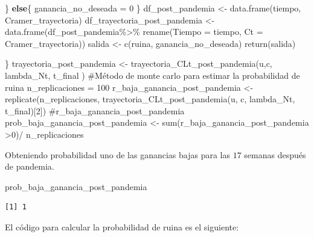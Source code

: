 \documentclass[
  us-letterpaper,
]{scrreprt}
\newenvironment{Shaded}{\begin{snugshade}}{\end{snugshade}}
\newcommand{\AttributeTok}[1]{\textcolor[rgb]{0.40,0.45,0.13}{#1}}
\newcommand{\CommentTok}[1]{\textcolor[rgb]{0.37,0.37,0.37}{#1}}
\newcommand{\ControlFlowTok}[1]{\textcolor[rgb]{0.00,0.23,0.31}{\textbf{#1}}}
\newcommand{\DecValTok}[1]{\textcolor[rgb]{0.68,0.00,0.00}{#1}}
\newcommand{\FunctionTok}[1]{\textcolor[rgb]{0.28,0.35,0.67}{#1}}
\newcommand{\NormalTok}[1]{\textcolor[rgb]{0.00,0.23,0.31}{#1}}
\newcommand{\OtherTok}[1]{\textcolor[rgb]{0.00,0.23,0.31}{#1}}
\newcommand{\SpecialCharTok}[1]{\textcolor[rgb]{0.37,0.37,0.37}{#1}}
\theoremstyle{plain}
\theoremstyle{plain}
\theoremstyle{definition}
\theoremstyle{remark}
\begin{document}
\begin{Shaded}
\begin{Highlighting}[]
\NormalTok{  \} }
  \ControlFlowTok{else}\NormalTok{\{}
\NormalTok{    ganancia\_no\_deseada }\OtherTok{=} \DecValTok{0}
\NormalTok{  \}}
\NormalTok{  df\_post\_pandemia }\OtherTok{\textless{}{-}} \FunctionTok{data.frame}\NormalTok{(tiempo, Cramer\_trayectoria)}
\NormalTok{  df\_trayectoria\_post\_pandemia }\OtherTok{\textless{}{-}} \FunctionTok{data.frame}\NormalTok{(df\_post\_pandemia}\SpecialCharTok{\%\textgreater{}\%}
                                            \FunctionTok{rename}\NormalTok{(}\AttributeTok{Tiempo =}\NormalTok{ tiempo, }
                                            \AttributeTok{Ct =}\NormalTok{ Cramer\_trayectoria))}
\NormalTok{  salida }\OtherTok{\textless{}{-}} \FunctionTok{c}\NormalTok{(ruina, ganancia\_no\_deseada)}
  \FunctionTok{return}\NormalTok{(salida)}
  
\NormalTok{\}}
\NormalTok{trayectoria\_post\_pandemia }\OtherTok{\textless{}{-}} \FunctionTok{trayectoria\_CLt\_post\_pandemia}\NormalTok{(u,c,}
\NormalTok{                                            lambda\_Nt, t\_final )}
\CommentTok{\#Método de monte carlo para estimar la probabilidad de ruina}
\NormalTok{n\_replicaciones }\OtherTok{=} \DecValTok{100}
\NormalTok{r\_baja\_ganancia\_post\_pandemia }\OtherTok{\textless{}{-}} \FunctionTok{replicate}\NormalTok{(n\_replicaciones, }
          \FunctionTok{trayectoria\_CLt\_post\_pandemia}\NormalTok{(u, c, lambda\_Nt, t\_final)[}\DecValTok{2}\NormalTok{])}
\CommentTok{\#r\_baja\_ganancia\_post\_pandemia }
\NormalTok{prob\_baja\_ganancia\_post\_pandemia }\OtherTok{\textless{}{-}} \FunctionTok{sum}\NormalTok{(r\_baja\_ganancia\_post\_pandemia }\SpecialCharTok{\textgreater{}}\DecValTok{0}\NormalTok{)}\SpecialCharTok{/}
\NormalTok{n\_replicaciones}
\end{Highlighting}
\end{Shaded}

Obteniendo probabilidad uno de las ganancias bajas para las \(17\)
semanas después de pandemia.

\begin{Shaded}
\begin{Highlighting}[]
\NormalTok{prob\_baja\_ganancia\_post\_pandemia}
\end{Highlighting}
\end{Shaded}

\begin{verbatim}
[1] 1
\end{verbatim}

El código para calcular la probabilidad de ruina es el siguiente:
\end{document}
